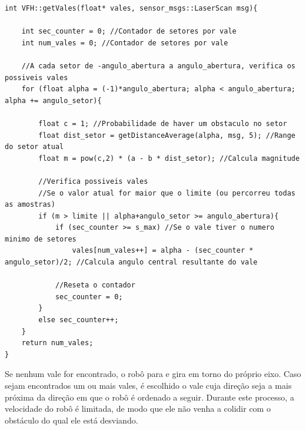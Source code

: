 \begin{lstlisting}[frame=single, label=cod:vales, style=customc, caption={Algoritmo de Verificação de Vales}]
int VFH::getVales(float* vales, sensor_msgs::LaserScan msg){
    
    int sec_counter = 0; //Contador de setores por vale
    int num_vales = 0; //Contador de setores por vale
    
    //A cada setor de -angulo_abertura a angulo_abertura, verifica os possiveis vales
    for (float alpha = (-1)*angulo_abertura; alpha < angulo_abertura; alpha += angulo_setor){
        
        float c = 1; //Probabilidade de haver um obstaculo no setor
        float dist_setor = getDistanceAverage(alpha, msg, 5); //Range do setor atual
        float m = pow(c,2) * (a - b * dist_setor); //Calcula magnitude
        
        //Verifica possiveis vales
        //Se o valor atual for maior que o limite (ou percorreu todas as amostras)
        if (m > limite || alpha+angulo_setor >= angulo_abertura){
            if (sec_counter >= s_max) //Se o vale tiver o numero minimo de setores
                vales[num_vales++] = alpha - (sec_counter * angulo_setor)/2; //Calcula angulo central resultante do vale
            
            //Reseta o contador
            sec_counter = 0;
        }
        else sec_counter++;
    }
    return num_vales;
}
\end{lstlisting}


Se nenhum vale for encontrado, o robô para e gira em torno do próprio
eixo. Caso sejam encontrados um ou mais vales, é escolhido o vale cuja
direção seja a mais próxima da direção em que o robô é ordenado a
seguir. Durante este processo, a velocidade do robô é limitada, de modo
que ele não venha a colidir com o obstáculo do qual ele está
desviando.

